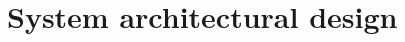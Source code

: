 \documentclass[Main]{subfiles}
\begin{document}
\chapter{System architectural design}




\end{document}
